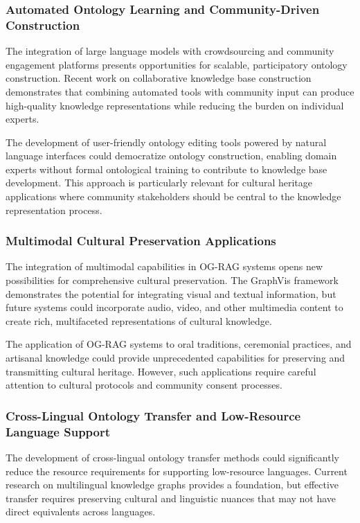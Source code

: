 \subsubsection{Automated Ontology Learning and Community-Driven Construction}

The integration of large language models with crowdsourcing and community engagement platforms presents opportunities for scalable, participatory ontology construction. Recent work on collaborative knowledge base construction \cite{zhou2024collaborative} demonstrates that combining automated tools with community input can produce high-quality knowledge representations while reducing the burden on individual experts.

The development of user-friendly ontology editing tools powered by natural language interfaces could democratize ontology construction, enabling domain experts without formal ontological training to contribute to knowledge base development. This approach is particularly relevant for cultural heritage applications where community stakeholders should be central to the knowledge representation process.

\subsubsection{Multimodal Cultural Preservation Applications}

The integration of multimodal capabilities in OG-RAG systems opens new possibilities for comprehensive cultural preservation. The GraphVis framework \cite{zhang2024graphvis} demonstrates the potential for integrating visual and textual information, but future systems could incorporate audio, video, and other multimedia content to create rich, multifaceted representations of cultural knowledge.

The application of OG-RAG systems to oral traditions, ceremonial practices, and artisanal knowledge could provide unprecedented capabilities for preserving and transmitting cultural heritage. However, such applications require careful attention to cultural protocols and community consent processes.

\subsubsection{Cross-Lingual Ontology Transfer and Low-Resource Language Support}

The development of cross-lingual ontology transfer methods could significantly reduce the resource requirements for supporting low-resource languages. Current research on multilingual knowledge graphs \cite{chen2024multilingual} provides a foundation, but effective transfer requires preserving cultural and linguistic nuances that may not have direct equivalents across languages.

